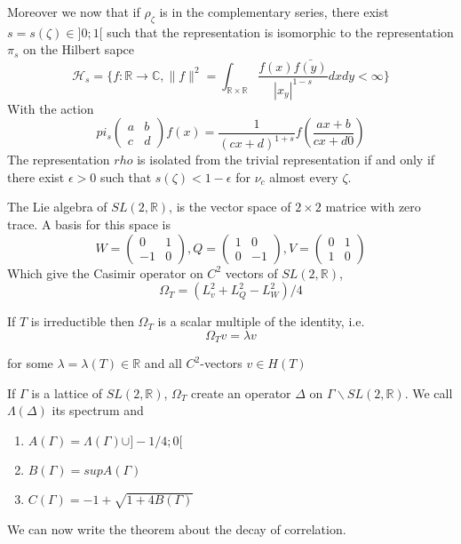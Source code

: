 Moreover we now that if $\rho_\zeta$ is in the complementary series, there exist $s=s(\zeta) \in ]0;1[$ such that the representation is isomorphic to the representation $\pi_s$ on the Hilbert sapce \[
\mathcal{H}_s =
\{ f:\mathbb{R} \to \mathbb{C}
, \|f \|^2 = \int_{\mathbb{R} \times \mathbb{R}}
 \frac{f(x) \bar{f(y)}}{|x_y|^{1-s}}dxdy < \infty\}
\]
With the action \[
pi_s \begin{pmatrix}a & b \\c & d \end{pmatrix}f(x)=\frac{1}{(cx+d)^{1+s}}f(\frac{ax+b}{cx+d0})
\]
The representation $rho$ is isolated from the trivial representation if and only if there exist $\epsilon >0$ such that $s(\zeta)<1-\epsilon$ for $\nu_c$ almost every $\zeta$.


The Lie algebra of $SL(2,\mathbb{R})$, is the vector space of $2 \times 2$ matrice with zero trace. A basis for this space is \[
W=\begin{pmatrix} 0 & 1 \\ -1 & 0 \end{pmatrix}, Q=\begin{pmatrix} 1 & 0 \\ 0 & -1 \end{pmatrix}, V=\begin{pmatrix} 0 & 1 \\ 1 & 0 \end{pmatrix}
\]
Which give the Casimir operator on $C^2$ vectors of $SL(2,\mathbb{R})$, \[
\Omega_T = (L_v^2+L_Q^2-L_W^2)/4
\]

If $T$ is irreductible then $\Omega_T$ is a scalar multiple of the identity, i.e. \[
\Omega_T v = \lambda v
\]

for some $\lambda=\lambda(T)\in \mathbb{R}$ and all $C^2$-vectors $v \in H(T)$

If $\Gamma$ is a lattice of $SL(2,\mathbb{R})$, $\Omega_T$ create an operator $\Delta$ on $\Gamma \backslash SL(2,\mathbb{R})$. We call $\Lambda(\Delta)$ its spectrum and
\begin{enumerate}
\item $A(\Gamma)=\Lambda(\Gamma) \cup ]-1/4;0[$
\item $B(\Gamma)=sup A(\Gamma)$
\item $C(\Gamma)= -1 + \sqrt{1+4 B(\Gamma)}$
\end{enumerate}

We can now write the theorem about the decay of correlation.

